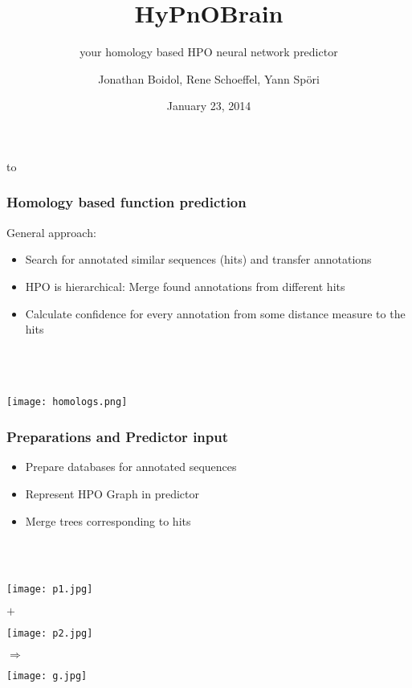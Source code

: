 \documentclass{beamer}
\author{Jonathan Boidol, Rene Schoeffel, Yann Sp\"ori}
\title{HyPnOBrain}
\subtitle{your homology based HPO neural network predictor}
\date{January 23, 2014 }
\begin{document}
{
\usebackgroundtemplate%
{%
    \vbox to 
    
}
 
\begin{frame}
\maketitle
 
\end{frame}
}
\begin{frame}
  \frametitle{Homology based function prediction}
  General approach:
  \begin{itemize}
  	\item Search for annotated similar sequences (hits) and transfer annotations
  	\item HPO is hierarchical: Merge found annotations from different hits
  	\item Calculate confidence for every annotation from some distance measure to the hits
  \end{itemize}
  \hfill\\  \hfill\\  \hfill\\
  \hfill\texttt{[image: homologs.png]}

\end{frame}

\begin{frame}
	\frametitle{Preparations and Predictor input}
		\begin{itemize}
			\item Prepare databases for annotated sequences
			\item Represent HPO Graph in predictor
			\item Merge trees corresponding to hits
		\end{itemize}
		\hfill\\\hfill\\
		\begin{minipage}{0.1\textwidth}
			\hfill
		\end{minipage}
		\begin{minipage}{0.2\textwidth}
			\texttt{[image: p1.jpg]}	
		\end{minipage}$+$\hspace*{1em}
		\begin{minipage}{0.1\textwidth}
			\texttt{[image: p2.jpg]}\\
			\vspace*{1.0em}
		\end{minipage}$\Rightarrow$
		\begin{minipage}{0.3\textwidth}
		\texttt{[image: g.jpg]}
		\end{minipage}
		
		
\end{frame}
\end{document}
